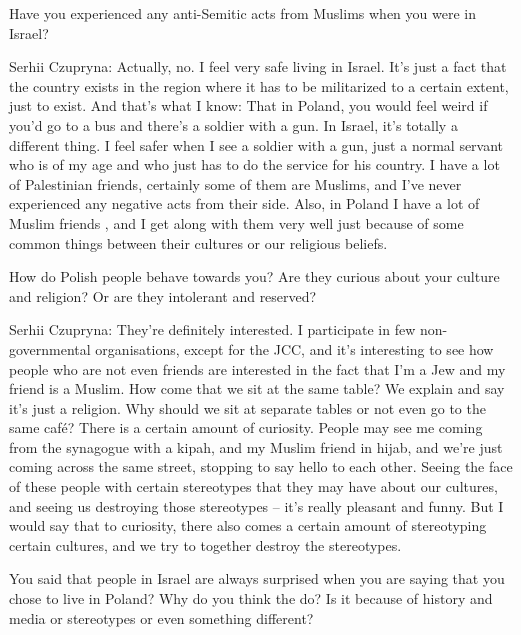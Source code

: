 Have you experienced any anti-Semitic acts from Muslims when you were in Israel? 

Serhii Czupryna: Actually, no. I feel very safe living in Israel. It’s just a fact that the country exists in the region where it has to be militarized to a certain extent, just to exist. And that’s what I know: That in Poland, you would feel weird if you’d go to a bus and there’s a soldier with a gun. In Israel, it’s totally a different thing. I feel safer when I see a soldier with a gun, just a normal servant who is of my age and who just has to do the service for his country. I have a lot of Palestinian friends, certainly some of them are Muslims, and I’ve never experienced any negative acts from their side. Also, in Poland I have a lot of Muslim friends , and I get along with them very well just because of some common things between their cultures or our religious beliefs.  

How do Polish people behave towards you? Are they curious about your culture and religion? Or are they intolerant and reserved? 

Serhii Czupryna: They’re definitely interested. I participate in few non-governmental organisations, except for the JCC, and it’s interesting to see how people who are not even friends are interested in the fact that I’m a Jew and my friend is a Muslim. How come that we sit at the same table? We explain and say it’s just a religion. Why should we sit at separate tables or not even go to the same café? There is a certain amount of curiosity. People may see me coming from the synagogue with a kipah, and my Muslim friend in hijab, and we’re just coming across the same street, stopping to say hello to each other. Seeing the face of these people with certain stereotypes that they may have about our cultures, and seeing us destroying those stereotypes – it’s really pleasant and funny. But I would say that to curiosity, there also comes a certain amount of stereotyping certain cultures, and we try to together destroy the stereotypes.  

You said that people in Israel are always surprised when you are saying that you chose to live in Poland? Why do you think the do? Is it because of history and media or stereotypes or even something different? 


